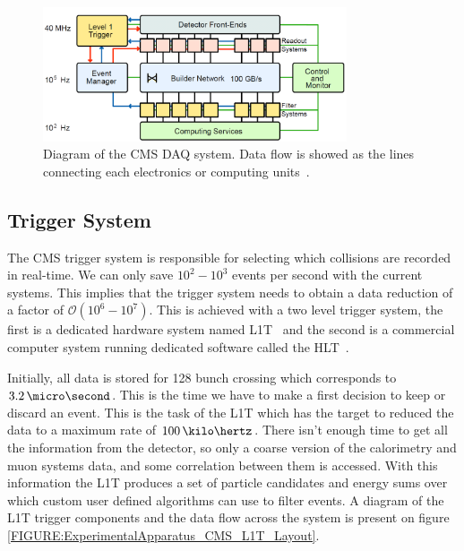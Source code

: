 \begin{figure}[!htb]
  \centering
  \includegraphics[width=0.80\textwidth]{Chapter02/CMS/Images/CMS_DAQ_Diagram.png}
  \caption{Diagram of the \gls{CMS} \gls{DAQ} system. Data flow is showed as the lines connecting each electronics or computing units~\cite{ARTICLE:TheCMSExperiment}.}
  \label{FIGURE:ExperimentalApparatus_CMS_DAQ_Diagram}
\end{figure}

\subsection{Trigger System}
\label{SUBSECTION:ExperimentalApparatus_CMS_Trigger}


The \gls{CMS} trigger system is responsible for selecting which collisions are recorded in real-time. We can only save $10^2-10^3$ events per second with the current systems. This implies that the trigger system needs to obtain a data reduction of a factor of $\mathcal{O}(10^6-10^7)$. This is achieved with a two level trigger system, the first is a dedicated hardware system named \acrfull{L1T}~\cite{CMSTDR:CMSTridasTDRVol1} and the second is a commercial computer system running dedicated software called the \acrfull{HLT}~\cite{CMSTDR:CMSTridasTDRVol2}.

Initially, all data is stored for 128 bunch crossing which corresponds to $3.2\,\micro\second$. This is the time we have to make a first decision to keep or discard an event. This is the task of the \gls{L1T} which has the target to reduced the data to a maximum rate of $100\,\kilo\hertz$. There isn't enough time to get all the information from the detector, so only a coarse version of the calorimetry and muon systems data, and some correlation between them is accessed. With this information the \gls{L1T} produces a set of particle candidates and energy sums over which custom user defined algorithms can use to filter events. A diagram of the \gls{L1T} trigger components and the data flow across the system is present on figure \ref{FIGURE:ExperimentalApparatus_CMS_L1T_Layout}.

